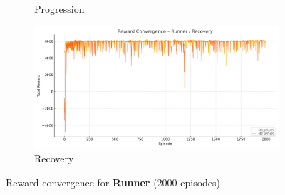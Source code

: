 \begin{figure}[htbp]
\begin{subfigure}[b]{0.45\textwidth}
    \caption{Progression}
  \end{subfigure}
  \hfill
  \begin{subfigure}[b]{0.45\textwidth}
    \includegraphics[width=\textwidth]{images/runner_recovery_convergence.png}
    \caption{Recovery}
  \end{subfigure}
  \caption{Reward convergence for \textbf{Runner} (2000 episodes)}
  \label{fig:runner_convergence}
\end{figure}


